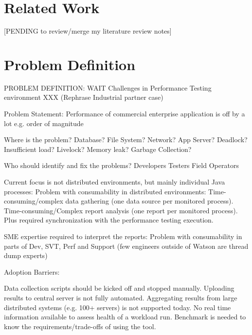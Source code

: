 \documentclass[runningheads,a4paper]{llncs}
\begin{document}

\section{Related Work}

[PENDING to review/merge my literature review notes]



\section{Problem Definition}

PROBLEM DEFINITION: WAIT Challenges in Performance Testing environment 
XXX (Rephrase Industrial partner case)

Problem Statement: Performance of commercial enterprise application is off by a
lot e.g. order of magnitude

Where is the problem?
	Database? 	File System?
	Network?	App Server?
	Deadlock?	Insufficient load?
	Livelock?	Memory leak?
	Garbage Collection?

Who should identify and fix the problems?
	Developers
	Testers
	Field Operators

Current focus is not distributed environments, but mainly individual Java processes:
Problem with consumability in distributed environments:
Time-consuming/complex data gathering (one data source per monitored process).
Time-consuming/Complex report analysis (one report per monitored process).
Plus required synchronization with the performance testing execution.

SME expertise required to interpret the reports:
Problem with consumability in parts of Dev, SVT, Perf and Support (few engineers outside of Watson are thread dump experts)


Adoption Barriers: 

Data collection scripts should be kicked off and stopped manually.
Uploading results to central server is not fully automated.
Aggregating results from large distributed systems (e.g. 100+ servers) is not supported today.
No real time information available to assess health of a workload run.
Benchmark is needed to know the requirements/trade-offs of using the tool.
\end{document}
